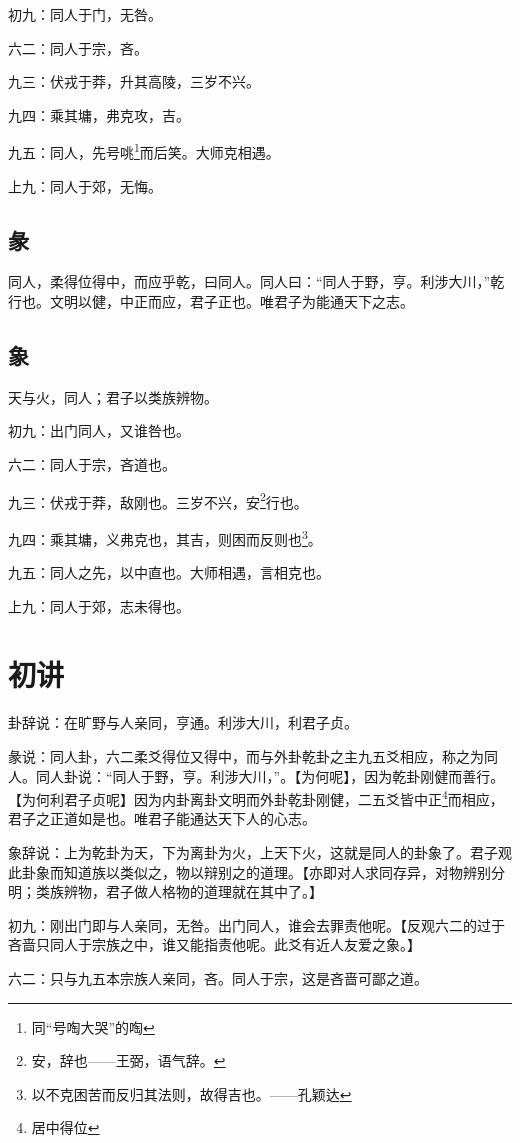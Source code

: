 \documentclass[12pt,oneside]{book}
\begin{document}
初九：同人于门，无咎。

六二：同人于宗，吝。

九三：伏戎于莽，升其高陵，三岁不兴。

九四：乘其墉，弗克攻，吉。

九五：同人，先号咷\footnote{同“号啕大哭”的啕}而后笑。大师克相遇。

上九：同人于郊，无悔。

\subsection{彖}
同人，柔得位得中，而应乎乾，曰同人。同人曰：“同人于野，亨。利涉大川，”乾行也。文明以健，中正而应，君子正也。唯君子为能通天下之志。

\subsection{象}
天与火，同人；君子以类族辨物。

初九：出门同人，又谁咎也。

六二：同人于宗，吝道也。

九三：伏戎于莽，敌刚也。三岁不兴，安\footnote{安，辞也——王弼，语气辞。}行也。

九四：乘其墉，义弗克也，其吉，则困而反则也\footnote{以不克困苦而反归其法则，故得吉也。——孔颖达}。

九五：同人之先，以中直也。大师相遇，言相克也。

上九：同人于郊，志未得也。

\section{初讲}
卦辞说：在旷野与人亲同，亨通。利涉大川，利君子贞。

彖说：同人卦，六二柔爻得位又得中，而与外卦乾卦之主九五爻相应，称之为同人。同人卦说：“同人于野，亨。利涉大川，”。【为何呢】，因为乾卦刚健而善行。【为何利君子贞呢】因为内卦离卦文明而外卦乾卦刚健，二五爻皆中正\footnote{居中得位}而相应，君子之正道如是也。唯君子能通达天下人的心志。

象辞说：上为乾卦为天，下为离卦为火，上天下火，这就是同人的卦象了。君子观此卦象而知道族以类似之，物以辩别之的道理。【亦即对人求同存异，对物辨别分明；类族辨物，君子做人格物的道理就在其中了。】

初九：刚出门即与人亲同，无咎。出门同人，谁会去罪责他呢。【反观六二的过于吝啬只同人于宗族之中，谁又能指责他呢。此爻有近人友爱之象。】

六二：只与九五本宗族人亲同，吝。同人于宗，这是吝啬可鄙之道。
\end{document}
